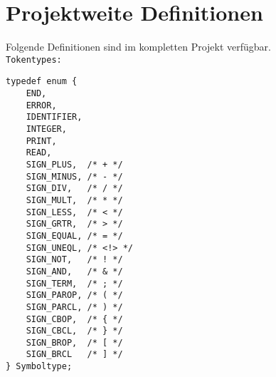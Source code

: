 \chapter{Projektweite Definitionen}
\label{chap:project_defs}

Folgende Definitionen sind im kompletten Projekt verfügbar.\\

\texttt{Tokentypes:}
\begin{lstlisting}
typedef enum {
	END,
	ERROR,
	IDENTIFIER,
	INTEGER,
	PRINT,
	READ,
	SIGN_PLUS,	/* + */
	SIGN_MINUS,	/* - */
	SIGN_DIV,	/* / */
	SIGN_MULT,	/* * */
	SIGN_LESS,	/* < */
	SIGN_GRTR,	/* > */
	SIGN_EQUAL,	/* = */
	SIGN_UNEQL,	/* <!> */
	SIGN_NOT,	/* ! */
	SIGN_AND,	/* & */
	SIGN_TERM,	/* ; */
	SIGN_PAROP,	/* ( */
	SIGN_PARCL,	/* ) */
	SIGN_CBOP,	/* { */
	SIGN_CBCL,	/* } */
	SIGN_BROP,	/* [ */
	SIGN_BRCL	/* ] */
} Symboltype;
\end{lstlisting}